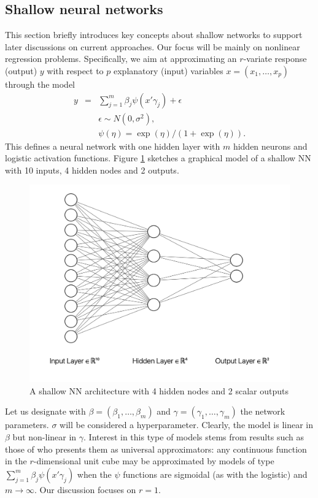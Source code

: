 \subsection{Shallow neural networks}
This section briefly introduces key concepts
about shallow networks to support later discussions on current approaches.
Our focus will be mainly on nonlinear regression 
problems. Specifically, we aim at approximating 
an $r$-variate response (output) $y$ with respect to $p$ explanatory 
(input) variables $x=(x_1,\ldots,x_p)$ through the 
model
\begin{eqnarray}\label{kantora}
  y         & = & \sum_{j=1}^m \beta_j \psi(x' \gamma_j) +
                    \epsilon %
                    \nonumber\\
              & & \epsilon \sim N(0,\sigma^2),
                  \nonumber \\
              & & \psi(\eta) = \exp(\eta)/(1+\exp(\eta)).
                  \end{eqnarray}
This defines a neural network with one hidden 
layer with $m$ hidden neurons and logistic 
activation functions.
Figure \ref{figuradkk1} sketches 
a graphical model of a shallow NN with 10 inputs, 4 hidden nodes and 
2 outputs. 
\begin{figure}
    \centering
    \includegraphics[scale=0.5]{figures/net1.png}
    \caption{A shallow NN architecture with 4 hidden nodes and 2 scalar outputs}
    \label{figuradkk1}
\end{figure}

Let us designate with $\beta=(\beta_1,\ldots,\beta_m)$ and $\gamma=(\gamma_1,\ldots,\gamma_m)$ the network parameters. $\sigma$  
will be considered a hyperparameter. Clearly, the model
is linear in $\beta$ but non-linear in  
$\gamma$. Interest in this type of models stems from 
results such as those of \cite{cybenko1989approximation}
who presents them as universal approximators:
 any continuous function in the 
$r$-dimensional unit cube 
may be approximated by models of type
$\sum_{j=1}^m \beta_j \psi(x' \gamma_j)$
when the $\psi$
functions are sigmoidal (as with the logistic) and
$m\rightarrow \infty$. Our discussion focuses on $r=1$.



